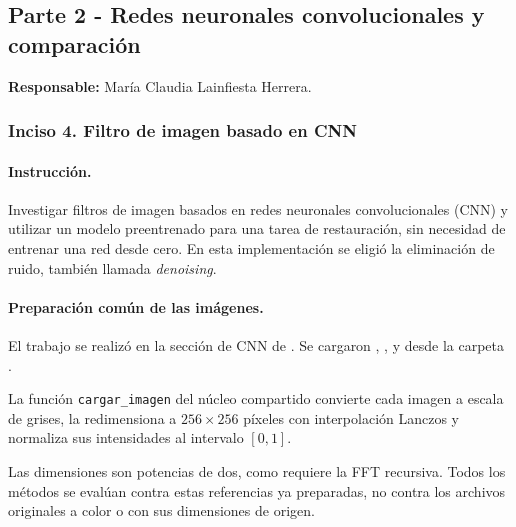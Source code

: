 \documentclass[11pt]{article}
\begin{document}

\clearpage


\subsection*{
    Parte 2 - Redes neuronales convolucionales y comparación
}

\noindent
\textbf{Responsable:} María Claudia Lainfiesta Herrera.

\subsubsection*{Inciso 4. Filtro de imagen basado en CNN}

\paragraph{Instrucción.}

Investigar filtros de imagen basados en redes neuronales
convolucionales (CNN) y utilizar un modelo preentrenado para
una tarea de restauración, sin necesidad de entrenar una red
desde cero. En esta implementación se eligió la eliminación
de ruido, también llamada \textit{denoising}.

\paragraph{Preparación común de las imágenes.}

El trabajo se realizó en la sección de CNN de
.
Se cargaron , ,
 y  desde la carpeta
.

La función \texttt{cargar\_imagen} del núcleo compartido
convierte cada imagen a escala de grises, la redimensiona a
$256\times256$ píxeles con interpolación Lanczos y normaliza
sus intensidades al intervalo $[0,1]$.

Las dimensiones son potencias de dos, como requiere la FFT
recursiva. Todos los métodos se evalúan contra estas
referencias ya preparadas, no contra los archivos originales
a color o con sus dimensiones de origen.

\end{document}
